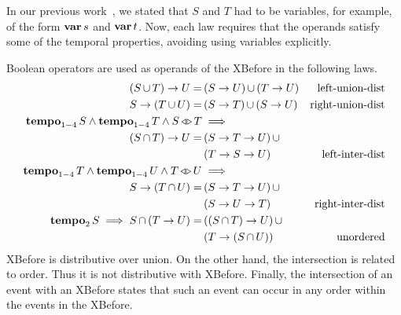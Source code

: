 \documentclass[12pt,openright,twoside,a4paper,oldfontcommands,english,brazil,final]{abntex2}
\theoremstyle{theo}
\def\varop{\ensuremath\operatorname{\mathbf{var}}}
\newcommand{\var}[1]{\ensuremath\varop #1}
\def\xbeforeop{\ensuremath\rightarrow}
\newcommand{\xbefore}[2]{\ensuremath #1 \xbeforeop #2 }
\def\tempoop{\ensuremath\operatorname{\mathbf{tempo}}}
\newcommand{\tempo}[2][1-4]{\ensuremath\tempoop_{#1} #2}
\def\independenteventsop{\ensuremath\operatorname{\triangleleft\triangleright}}
\newcommand{\independentevents}[2]{\ensuremath #1 \independenteventsop #2}
\newcommand{\parsin}[1]{\ensuremath\left( #1 \right)}
\def\union{\ensuremath\operatorname{\cup}}
\def\inter{\ensuremath\operatorname{\cap}}
\begin{document}
In our previous work~\cite{DM2015}, we stated that $S$ and $T$ had to be variables, for example, of the form $\var{s}$ and $\var{t}$.
Now, each law requires that the operands satisfy some of the temporal properties, avoiding using variables explicitly.

Boolean operators are used as operands of the \ac{XBefore} in the following laws.
%
\begin{subequations}
\begin{align}
\xbefore{\left(S \union T\right)}{U} =&
  \parsin{\xbefore{S}{U}} \union \parsin{\xbefore{T}{U}} &
  \text{left-union-dist}
  \label{thm:xbefore-sup-1}\\
%
\xbefore{S}{\left(T \union U\right)} =&
  \parsin{\xbefore{S}{T}} \union \parsin{\xbefore{S}{U}} &
  \text{right-union-dist}
  \label{thm:xbefore-sup-2}\\
%
\tempo{S} \land \tempo{T} \land \independentevents{S}{T} & \implies\nonumber \\
  \xbefore{\left(S \inter T\right)}{U} =&
  \parsin{\xbefore{\xbefore{S}{T}}{U}} \union \nonumber\\
  &\parsin{\xbefore{\xbefore{T}{S}}{U}} &
  \text{left-inter-dist}
  \label{thm:xbefore-inf-1}\\
%
\tempo{T} \land \tempo{U} \land \independentevents{T}{U} & \implies \nonumber\\
  \xbefore{S}{\left(T \inter U\right)} =&
  \parsin{\xbefore{S}{\xbefore{T}{U}}} \union \nonumber\\
  &\parsin{\xbefore{S}{\xbefore{U}{T}}} &
  \text{right-inter-dist}
  \label{thm:xbefore-inf-2}\\
%
\tempo[2]{S} \implies S \inter \parsin{\xbefore{T}{U}} =&
  \parsin{\xbefore{\parsin{S \inter T}}{U}} \union \nonumber\\
  &\parsin{\xbefore{T}{\parsin{S \inter U}}} &
  \text{unordered}
  \label{thm:and_xbefore_equiv_or_xbefore}
\end{align}
\end{subequations}
%
\ac{XBefore} is distributive over union.
On the other hand, the intersection is related to order.
Thus it is not distributive with \ac{XBefore}.
Finally, the intersection of an event with an \ac{XBefore} states that such an event can occur in any order within the events in the \ac{XBefore}.
\end{document}
